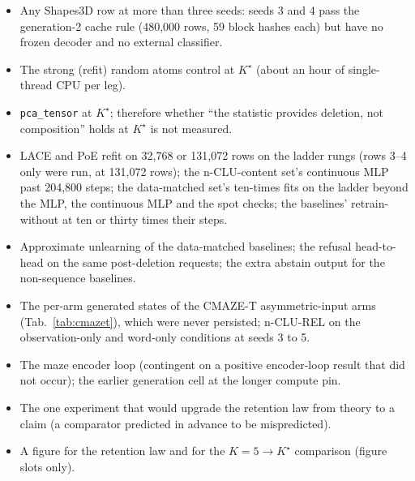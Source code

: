\documentclass{article} %
\newcommand{\Kstar}{\ensuremath{K^{\star}}}
\begin{document}
\begin{itemize}[leftmargin=*,itemsep=1pt]
\item Any Shapes3D row at more than three seeds: seeds 3 and 4 pass the generation-2 cache rule
  (480,000 rows, 59 block hashes each) but have no frozen decoder and no external classifier.
\item The strong (refit) random atoms control at $\Kstar$ (about an hour of
  single-thread CPU per leg). %
\item \texttt{pca\_tensor} at $\Kstar$; therefore whether ``the statistic provides deletion,
not composition'' holds at $\Kstar$ is not measured.
\item LACE and PoE refit on 32,768 or 131,072 rows on the ladder rungs (rows 3--4 only were run, at %
  131,072 rows); the n-CLU-content set's continuous MLP past 204,800 steps; the data-matched set's ten-times fits on the ladder %
  beyond the MLP, the continuous MLP and the spot checks; the baselines' retrain-without at ten or
  thirty times their steps.
\item Approximate unlearning of the data-matched baselines; the refusal head-to-head on the same
  post-deletion requests; the extra abstain output for the non-sequence baselines.
\item The per-arm generated states of the CMAZE-T asymmetric-input arms (Tab.~\ref{tab:cmazet}),
  which were never persisted; n-CLU-REL on the observation-only and word-only
  conditions at seeds 3 to 5.
\item The maze encoder loop (contingent on a positive encoder-loop result that did not occur); the
  earlier generation cell at the longer compute pin.
\item The one experiment that would upgrade the retention law from theory to a claim (a comparator
  predicted in advance to be mispredicted).
\item A figure for the retention law and for the $K=5\to\Kstar$
  comparison (figure slots only).
\end{itemize}

\end{document}
